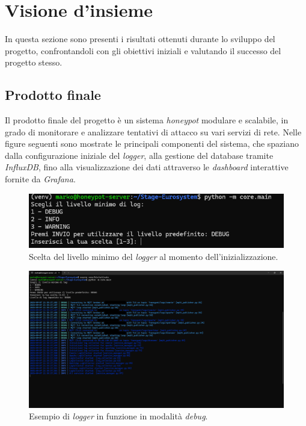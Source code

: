 \section{Visione d'insieme}
In questa sezione sono presenti i risultati ottenuti durante lo sviluppo del progetto, confrontandoli con gli obiettivi iniziali e valutando il successo del progetto stesso.
\subsection{Prodotto finale}
Il prodotto finale del progetto è un sistema \textit{honeypot} modulare e scalabile, in grado di monitorare e analizzare tentativi di attacco su vari servizi di rete.
Nelle figure seguenti sono mostrate le principali componenti del sistema, che spaziano dalla configurazione iniziale del \textit{logger}, alla gestione del database tramite \textit{InfluxDB}, fino alla visualizzazione dei dati attraverso le \textit{dashboard} interattive fornite da \textit{Grafana}.
\begin{figure}[H]
    \begin{center}
    \includegraphics[width=\textwidth]{img/environment.png}
    \caption{Scelta del livello minimo del \textit{logger} al momento dell'inizializzazione.}
    \label{fig:environment}
    \end{center}
\end{figure}
\begin{figure}[H]
    \begin{center}
    \includegraphics[width=\textwidth]{img/logger.png}
    \caption{Esempio di \textit{logger} in funzione in modalità \textit{debug}.}
    \label{fig:logger}
    \end{center}
\end{figure}
